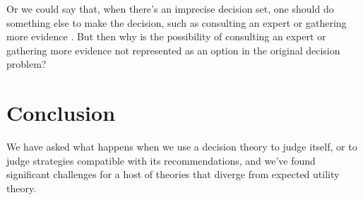 \documentclass[a4paper]{article}
\newcommand\U{\mathfrak{U}} %
\newcommand{\todoold}[2][]{\todo[backgroundcolor=white,bordercolor=orange!10,linecolor=gray!10, #1,caption={},textcolor=gray]{Pre-rev: #2}}
\newcommand{\todooldinfo}[2][]{\todoold[#1]{#2}}
\renewcommand{\color}[1]{}
\newenvironment{colored}[1]{\leavevmode\color{#1}}{}
\newcommand\SetDelimiter[1][]{
	\nonscript\,#1\vert \allowbreak \nonscript\,\mathopen{}}
\providecommand\given{\SetDelimiter}
\newenvironment{CCM rewritten}
{\begingroup\color{blue}} %
{\endgroup}              %
\begin{document}
Or we could say that, when there's an imprecise decision set, one should do something else to make the decision, such as consulting an expert or gathering more evidence \citep{de2014efficient}. But then why is the possibility of consulting an expert or gathering more evidence not represented as an option in the original decision problem?




%
%
%
%
%



\section{Conclusion}


We have asked what happens when we use a decision theory to judge itself, or to judge strategies compatible with its recommendations, and we've found significant challenges for a host of theories that diverge from expected utility theory. 
\end{document}
